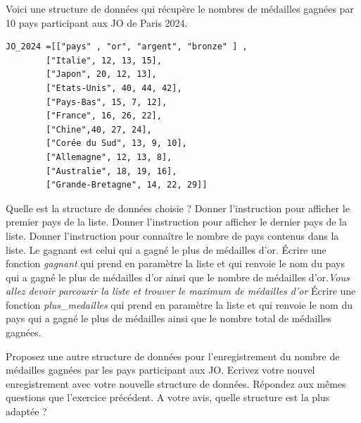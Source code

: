 \begin{Exercise}[title = {Listes et dictionnaires}]
Voici une structure de données qui récupère le nombres de médailles gagnées par 10 pays participant aux JO de Paris 2024.
\begin{lstlisting}
JO_2024 =[["pays" , "or", "argent", "bronze" ] ,
        ["Italie", 12, 13, 15],
        ["Japon", 20, 12, 13],
        ["Etats-Unis", 40, 44, 42],
        ["Pays-Bas", 15, 7, 12],
        ["France", 16, 26, 22],
        ["Chine",40, 27, 24],
        ["Corée du Sud", 13, 9, 10],
        ["Allemagne", 12, 13, 8],
        ["Australie", 18, 19, 16],
        ["Grande-Bretagne", 14, 22, 29]]
\end{lstlisting}
\Question Quelle est la structure de données choisie ?
\Question Donner l'instruction pour afficher le premier pays de la liste.
\Question Donner l'instruction pour afficher le dernier pays de la liste.
\Question Donner l'instruction pour connaître le nombre de pays contenus dans la liste.
\Question Le gagnant est celui qui a gagné le plus de médailles d'or. Écrire une fonction \textit{gagnant} qui prend en paramètre la liste et qui renvoie le nom du pays qui a gagné le plus de médailles d'or ainsi que le nombre de médailles d'or.\textit{Vous allez devoir parcourir la liste et trouver le maximum de médailles d'or}
\Question Écrire une fonction \textit{plus\_medailles} qui prend en paramètre la liste et qui renvoie le nom du pays qui a gagné le plus de médailles ainsi que le nombre total de médailles gagnées.

\Question Proposez une autre structure de données pour l'enregistrement du nombre de médailles gagnées par les pays participant aux JO.
\Question Ecrivez votre nouvel enregistrement avec votre nouvelle structure de données.
\Question Répondez aux mêmes questions que l'exercice précédent.
\Question A votre avis, quelle structure est la plus adaptée ?
\end{Exercise}
